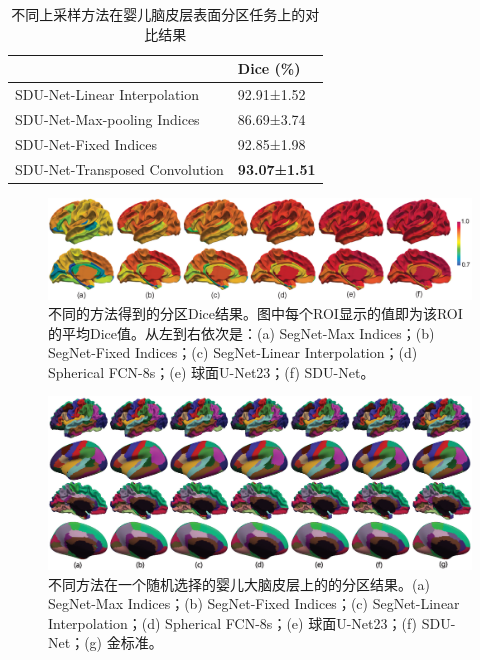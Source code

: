 \begin{table}[t]
		\caption{不同上采样方法在婴儿脑皮层表面分区任务上的对比结果}
		\label{tab:上采样方法比较}
		\centering
		\begin{tabularx}{0.75\linewidth}{X<{\centering} | X<{\centering}}
			\hline
			& Dice (\%)        \\
			\hline		  
			SDU-Net-Linear Interpolation     &     92.91±1.52   \\
			SDU-Net-Max-pooling Indices      &     86.69±3.74   \\
			SDU-Net-Fixed Indices            &     92.85±1.98    \\
			SDU-Net-Transposed Convolution   &	   \textbf{93.07±1.51}  \\
			\hline					 
		\end{tabularx}
\end{table}

\begin{figure}[t]
	\centering
	\includegraphics[width=\linewidth]{figure/figure_roi_result.eps}
	\caption{不同的方法得到的分区Dice结果。图中每个ROI显示的值即为该ROI的平均Dice值。从左到右依次是：(a) SegNet-Max Indices；(b) SegNet-Fixed Indices；(c) SegNet-Linear Interpolation；(d) Spherical FCN-8s；(e) 球面U-Net23；(f) SDU-Net。}
	\label{fig:par_results_roiwise}
\end{figure}

\begin{figure}[t]
	\centering
	\includegraphics[width=\linewidth]{figure/figure_parcellation_result.eps}
	\caption{不同方法在一个随机选择的婴儿大脑皮层上的的分区结果。(a) SegNet-Max Indices；(b) SegNet-Fixed Indices；(c) SegNet-Linear Interpolation；(d) Spherical FCN-8s；(e) 球面U-Net23；(f) SDU-Net；(g) 金标准。}
	\label{fig:par_results_35}
\end{figure}


